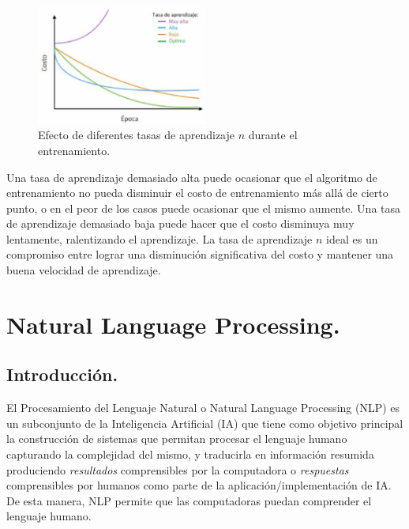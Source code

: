 \documentclass[12pt,a4paper]{article}
\begin{document}
\begin{sloppypar}
\begin{figure}[H]    %
 \centering
 \includegraphics[width=0.5\textwidth]{images/ANN/6-ANN.png}
  \captionsetup{justification=centering,margin=3cm}
 \caption{Efecto de diferentes tasas de aprendizaje $n$ durante el entrenamiento\cite{ANN_25}.} 
 \label{fig:ann_6}
\end{figure}

Una tasa de aprendizaje demasiado alta puede ocasionar que el algoritmo de entrenamiento no pueda disminuir el costo de entrenamiento más allá de cierto punto, o en el peor de los casos puede ocasionar que el mismo aumente. Una tasa de aprendizaje demasiado baja puede hacer que el costo disminuya muy lentamente, ralentizando el aprendizaje. La tasa de aprendizaje $n$ ideal es un compromiso entre lograr una disminución significativa del costo y mantener una buena velocidad de aprendizaje\cite{ANN_25}.
\cleardoublepage

\section{Natural Language Processing.}\label{4.NaturalLanguageProcessing}

\subsection{Introducción.}\label{Intro_NLP}

El Procesamiento del Lenguaje Natural o Natural Language Processing (NLP) es un subconjunto de la Inteligencia Artificial (IA) que tiene como objetivo principal la construcción de sistemas que permitan procesar el lenguaje humano capturando la complejidad del mismo, y traducirla en información resumida produciendo \textit{resultados} comprensibles por la computadora o \textit{respuestas} comprensibles por humanos como parte de la aplicación/implementación de IA. De esta manera, NLP permite que las computadoras puedan comprender el lenguaje humano.


\end{sloppypar}
\end{document}
